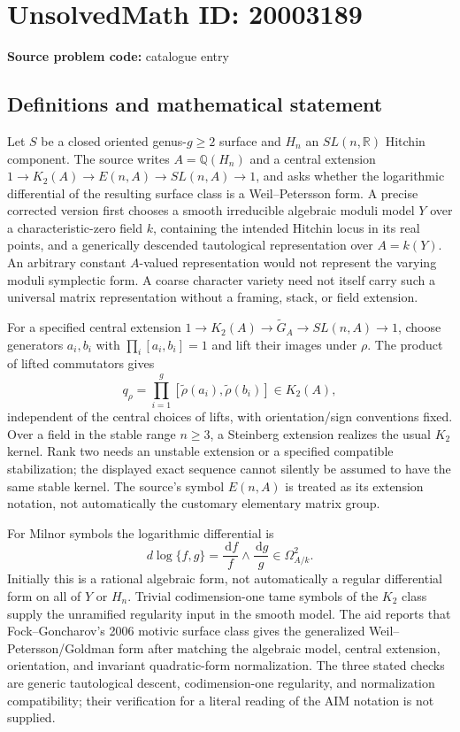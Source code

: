 \documentclass[11pt]{article}
\newcommand{\Q}{\mathbb{Q}}
\newcommand{\R}{\mathbb{R}}
\newcommand{\dd}{\,\mathrm{d}}
\begin{document}
\section*{UnsolvedMath ID: 20003189}
\textbf{Source problem code:} catalogue entry
\subsection{Definitions and mathematical statement}
Let $S$ be a closed oriented genus-$g\geq2$ surface and $H_n$ an $SL(n,\R)$ Hitchin component. The source writes $A=\Q(H_n)$ and a central extension $1\to K_2(A)\to E(n,A)\to SL(n,A)\to1$, and asks whether the logarithmic differential of the resulting surface class is a Weil--Petersson form. A precise corrected version first chooses a smooth irreducible algebraic moduli model $Y$ over a characteristic-zero field $k$, containing the intended Hitchin locus in its real points, and a generically descended tautological representation over $A=k(Y)$. An arbitrary constant $A$-valued representation would not represent the varying moduli symplectic form. A coarse character variety need not itself carry such a universal matrix representation without a framing, stack, or field extension.

For a specified central extension $1\to K_2(A)\to\widetilde G_A\to SL(n,A)\to1$, choose generators $a_i,b_i$ with $\prod_i[a_i,b_i]=1$ and lift their images under $\rho$. The product of lifted commutators gives
\[
q_\rho=\prod_{i=1}^g[\widetilde\rho(a_i),\widetilde\rho(b_i)]\in K_2(A),
\]
independent of the central choices of lifts, with orientation/sign conventions fixed. Over a field in the stable range $n\geq3$, a Steinberg extension realizes the usual $K_2$ kernel. Rank two needs an unstable extension or a specified compatible stabilization; the displayed exact sequence cannot silently be assumed to have the same stable kernel. The source's symbol $E(n,A)$ is treated as its extension notation, not automatically the customary elementary matrix group.

For Milnor symbols the logarithmic differential is
\[
d\log\{f,g\}=\frac{\dd f}{f}\wedge\frac{\dd g}{g}\in\Omega^2_{A/k}.
\]
Initially this is a rational algebraic form, not automatically a regular differential form on all of $Y$ or $H_n$. Trivial codimension-one tame symbols of the $K_2$ class supply the unramified regularity input in the smooth model. The aid reports that Fock--Goncharov's 2006 motivic surface class gives the generalized Weil--Petersson/Goldman form after matching the algebraic model, central extension, orientation, and invariant quadratic-form normalization. The three stated checks are generic tautological descent, codimension-one regularity, and normalization compatibility; their verification for a literal reading of the AIM notation is not supplied.
\end{document}
